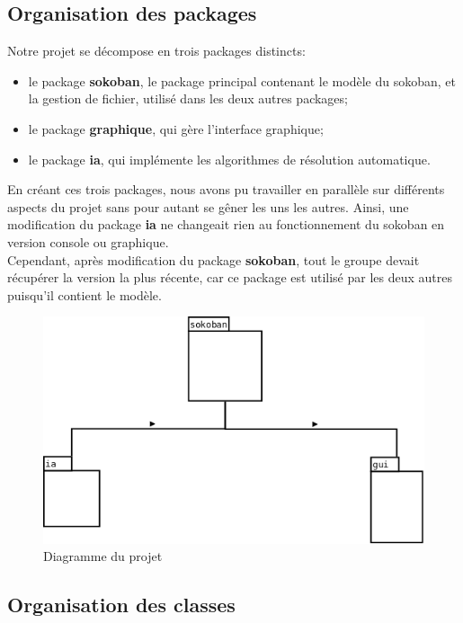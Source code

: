 \documentclass[a4paper,12pt]{article} %
\begin{document}
\subsection{Organisation des packages}

Notre projet se décompose en trois packages distincts:
\begin{itemize}
\item le package \textbf{sokoban}, le package principal contenant le modèle du sokoban, et la gestion de fichier, utilisé dans les deux autres packages;
\item le package \textbf{graphique}, qui gère l'interface graphique;
\item le package \textbf{ia}, qui implémente les algorithmes de résolution automatique.
\end{itemize}

En créant ces trois packages, nous avons pu travailler en parallèle sur différents aspects du projet sans pour autant se gêner les uns les autres.
Ainsi, une modification du package \textbf{ia} ne changeait rien au fonctionnement du sokoban en version console ou graphique.\\
Cependant, après modification du package \textbf{sokoban}, tout le groupe devait récupérer la version la plus récente, car ce package est utilisé par les deux autres puisqu'il contient le modèle.

\begin{figure}[!h]
\centering
\includegraphics[scale=0.5]{images/packages.png}
\caption{Diagramme du projet}
\end{figure}

\subsection{Organisation des classes}
\end{document}
